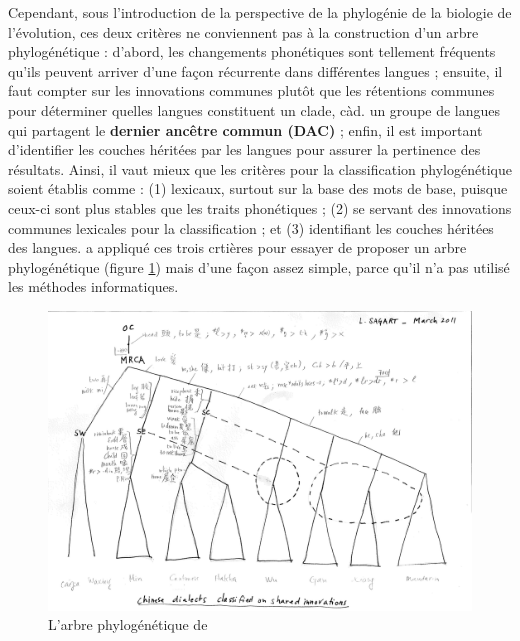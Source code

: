 \documentclass{scrbook}
\newcounter{c}[subsubsection]
\begin{document}
\begin{sloppypar}
Cependant, sous l'introduction de la perspective de la phylogénie de la biologie de l'évolution, ces deux critères ne conviennent pas à la construction d'un arbre phylogénétique : d'abord, les changements phonétiques sont tellement fréquents qu'ils peuvent arriver d'une façon récurrente dans différentes langues ; ensuite, il faut compter sur les innovations communes plutôt que les rétentions communes pour déterminer quelles langues constituent un clade, càd. un groupe de langues qui partagent le \textbf{dernier ancêtre commun (DAC)} ; enfin, il est important d'identifier les couches héritées par les langues pour assurer la pertinence des résultats. Ainsi, il vaut mieux que les critères pour la classification phylogénétique soient établis comme : (1) lexicaux, surtout sur la base des mots de base, puisque ceux-ci sont plus stables que les traits phonétiques ; (2) se servant des innovations communes lexicales pour la classification ; et (3) identifiant les couches héritées des langues. \textcite{sagart2011classifying} a appliqué ces trois crtières pour essayer de proposer un arbre phylogénétique (figure \ref{fig:sagart_class}) mais d'une façon assez simple, parce qu'il n'a pas utilisé les méthodes informatiques.

\begin{figure}
\centering
\includegraphics[scale=.3]{Figure/sagart}
\caption{L'arbre phylogénétique de \cite{sagart2011classifying}}
\label{fig:sagart_class}
\end{figure}


\end{sloppypar}
\end{document}
